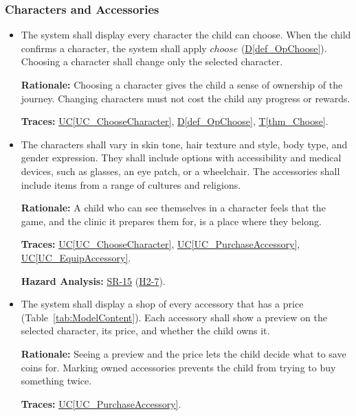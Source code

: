 \documentclass[12pt]{article}
\newcommand{\ucref}[1]{\hyperref[#1]{UC\ref*{#1}}}
\newcounter{reqnum} %
\newcommand{\thmref}[1]{\hyperref[#1]{T\ref*{#1}}}
\newcommand{\defref}[1]{\hyperref[#1]{D\ref*{#1}}}
\newcommand{\haurl}{https://team-hindsight.github.io/ophthamology-game/HazardAnalysis/HazardAnalysis.pdf}
\newcommand{\hasrref}[2]{\href{\haurl\#nameddest=sr:#1}{SR-#2}}
\newcommand{\hahazref}[2]{\href{\haurl\#nameddest=haz:#1}{H#2}}
\newcommand{\hazsr}[4]{\hasrref{#1}{#2} (\hahazref{#3}{#4})}
\begin{document}
\subsubsection{Characters and Accessories}
\label{sec_FRCharacters}

\begin{itemize}

\item[\refstepcounter{reqnum}\textbf{FR\thereqnum}\label{FR_ChooseCharacter}:]
The system shall display every character the child can choose. When the child
confirms a character, the system shall apply $\mathit{choose}$
(\defref{def_OpChoose}). Choosing a character shall change only the selected
character.

\textbf{Rationale:} Choosing a character gives the child a sense of ownership
of the journey. Changing characters must not cost the child any progress or
rewards.

\textbf{Traces:} \ucref{UC_ChooseCharacter}, \defref{def_OpChoose},
\thmref{thm_Choose}.

\item[\refstepcounter{reqnum}\textbf{FR\thereqnum}\label{FR_DiverseCharacters}:]
The characters shall vary in skin tone, hair texture and style, body type,
and gender expression. They shall include options with accessibility and
medical devices, such as glasses, an eye patch, or a wheelchair. The
accessories shall include items from a range of cultures and religions.

\textbf{Rationale:} A child who can see themselves in a character feels that the game, and
the clinic it prepares them for, is a place where they belong.

\textbf{Traces:} \ucref{UC_ChooseCharacter}, \ucref{UC_PurchaseAccessory},
\ucref{UC_EquipAccessory}.

\textbf{Hazard Analysis:} \hazsr{CharacterDiversityInclusivity}{15}{DiverseCharacterLibrary}{2-7}.

\item[\refstepcounter{reqnum}\textbf{FR\thereqnum}\label{FR_Shop}:]
The system shall display a shop of every accessory that has a price
(Table~\ref{tab:ModelContent}). Each accessory shall show a preview on the
selected character, its price, and whether the child owns it.

\textbf{Rationale:} Seeing a preview and the price lets the child decide what
to save coins for. Marking owned accessories prevents the child from trying to
buy something twice.

\textbf{Traces:} \ucref{UC_PurchaseAccessory}.


\end{itemize}
\end{document}
